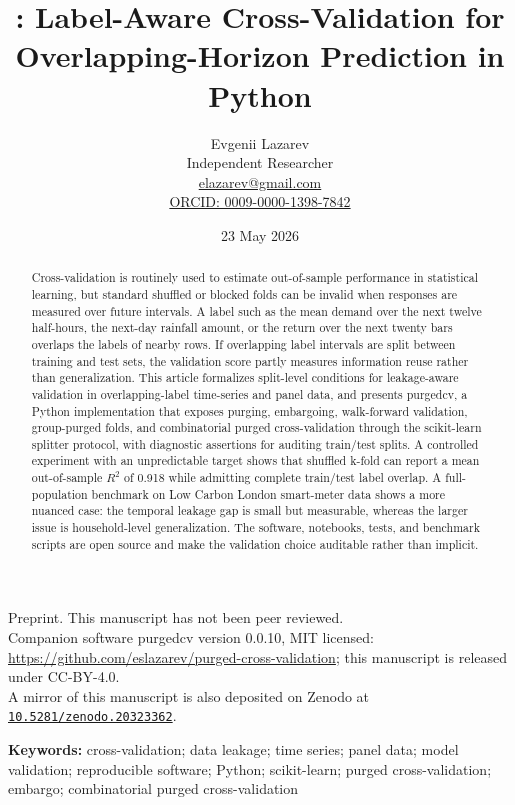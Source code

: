 \documentclass[11pt]{article}
\title{\pcv: Label-Aware Cross-Validation for Overlapping-Horizon Prediction in Python}
\author{Evgenii Lazarev\\Independent Researcher\\\href{mailto:elazarev@gmail.com}{elazarev@gmail.com}\\\href{https://orcid.org/0009-0000-1398-7842}{ORCID: 0009-0000-1398-7842}}
\date{23 May 2026}
\newcommand{\pcv}{\textsf{purgedcv}}
\newcommand{\pkg}[1]{\textsf{#1}}
\newcommand{\doi}[1]{\href{https://doi.org/#1}{\nolinkurl{#1}}}
\begin{document}
\maketitle

\begin{center}
\small
Preprint. This manuscript has not been peer reviewed.\\
Companion software \pcv{} version 0.0.10, MIT licensed: \url{https://github.com/eslazarev/purged-cross-validation}; this manuscript is released under CC-BY-4.0.\\
A mirror of this manuscript is also deposited on Zenodo at \doi{10.5281/zenodo.20323362}.
\end{center}

\begin{abstract}
Cross-validation is routinely used to estimate out-of-sample performance in
statistical learning, but standard shuffled or blocked folds can be invalid when
responses are measured over future intervals. A label such as the mean demand
over the next twelve half-hours, the next-day rainfall amount, or the return
over the next twenty bars overlaps the labels of nearby rows. If overlapping
label intervals are split between training and test sets, the validation score
partly measures information reuse rather than generalization. This article
formalizes split-level conditions for leakage-aware validation in
overlapping-label time-series and panel data, and presents \pcv, a Python
implementation that exposes purging, embargoing, walk-forward validation,
group-purged folds, and combinatorial purged cross-validation through the
\pkg{scikit-learn} splitter protocol, with diagnostic assertions for auditing
train/test splits. A controlled
experiment with an unpredictable target shows that shuffled k-fold can report a
mean out-of-sample $R^2$ of 0.918 while admitting complete train/test label
overlap. A full-population benchmark on Low Carbon London smart-meter data shows
a more nuanced case: the temporal leakage gap is small but measurable, whereas
the larger issue is household-level generalization. The software, notebooks,
tests, and benchmark scripts are open source and make the validation choice
auditable rather than implicit.
\end{abstract}

\noindent\textbf{Keywords:} cross-validation; data leakage; time series; panel
data; model validation; reproducible software; Python; scikit-learn; purged
cross-validation; embargo; combinatorial purged cross-validation
\end{document}
